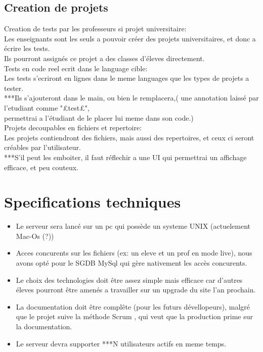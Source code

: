 \documentclass[12pt,a4paper,twoside]{article}
\begin{document}
\subsection{Creation de projets}
Creation de tests par les professeurs si projet universitaire:\\
Les enseignants sont les seuls a pouvoir créer des projets universitaires, et donc a écrire les tests.\\
Ils pourront assignés ce projet a des classes d'éleves directement.\\
Tests en code reel ecrit dans le language cible:\\
Les tests s'ecriront en lignes dans le meme languages que les types de projets a tester.\\
***Ils s'ajouteront dans le main, ou bien le remplacera,( une annotation laissé par l'etudiant comme "£test£",\\
permettrai a l'étudiant de le placer lui meme dans son code.)\\
Projets decoupables en fichiers et repertoire:\\
Les projets contiendront des fichiers, mais aussi des repertoires, et ceux ci seront créables par l'utilisateur.\\
***S'il peut les emboiter, il faut réflechir a une UI qui permettrai un affichage efficace, et peu couteux.\\


\section{Specifications techniques}

\begin{itemize}
\item Le serveur sera lancé sur un pc qui possède un systeme UNIX (actuelement Mac-Os (?))
\item Acces concurents sur les fichiers (ex: un eleve et un prof en mode live), nous avons opté pour le SGDB MySql qui gère nativement les accès concurents.
\item Le choix des technologies doit être assez simple mais efficace car d'autres éleves pourront être amenés a travailler sur un upgrade du site l'an prochain.
\item La documentation doit être complête (pour les futurs dévellopeurs), malgré que le projet suive la méthode Scrum , qui veut que la production prime sur la documentation.
\item Le serveur devra supporter ***N utilisateurs actifs en meme temps.
\end{itemize}
\end{document}
